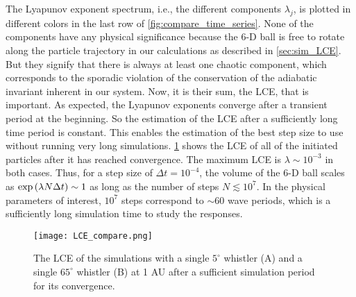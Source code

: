 The Lyapunov exponent spectrum, i.e., the different components $\lambda_j$, is
plotted in different colors in the last row of \cref{fig:compare_time_series}.
None of the components have any physical significance because the 6-D ball is free to rotate along the particle trajectory in our
calculations as described in \cref{sec:sim_LCE}. But they signify that there is
always at least one chaotic component, which corresponds to the sporadic
violation of the conservation of the adiabatic invariant inherent in our system.
Now, it is their sum, the LCE, that is important. As expected, the Lyapunov
exponents converge after a transient period at the beginning. So the estimation
of the LCE after a sufficiently long time period is constant. This enables the
estimation of the best step size to use without running very long simulations.
\cref{fig:LCE_compare} shows the LCE of all of the initiated particles after it
has reached convergence. The maximum LCE is $\lambda\sim10^{-3}$ in both cases.
Thus, for a step size of $\Delta t=10^{-4}$, the volume of the 6-D ball scales
as $\exp\qty(\lambda N\Delta t)\sim 1$ as long as the number of steps
$N\lesssim10^{7}$. In the physical parameters of interest, $10^7$ steps 
correspond to $\sim 60$ wave periods, which is a sufficiently long simulation 
time to study the responses.

\begin{figure}
    \centering
    \texttt{[image: LCE\_compare.png]}
    \caption{The LCE of the simulations with a single $5^\circ$ whistler (A) and
    a single $65^\circ$ whistler (B) at 1 AU after a sufficient simulation
period for its convergence.}
\label{fig:LCE_compare}
\end{figure}

